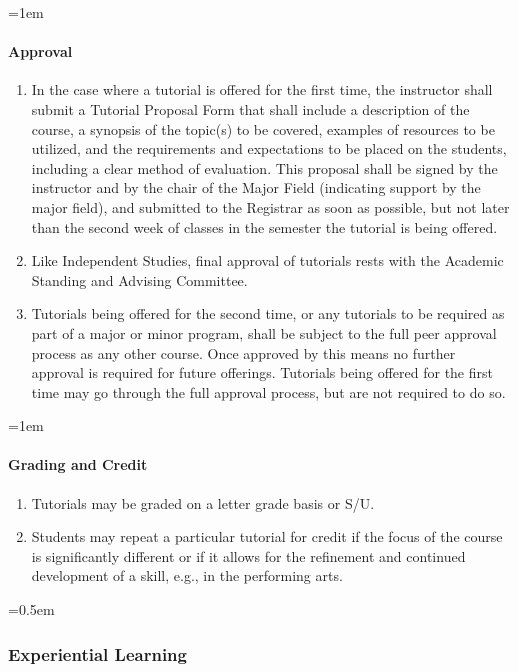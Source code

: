 \documentclass{manual}
\let\oldsubsubsection\subsubsection
\renewcommand\subsubsection{\leftskip=0.5em\oldsubsubsection}
\let\oldparagraph\paragraph
\renewcommand\paragraph{\leftskip=1em\oldparagraph}
\newcommand{\itemLevelA}{\alph*.}
\newcommand{\itemRefA}{\alph*}
\begin{document}
\paragraph{Approval }
\begin{enumerate}[label=\itemLevelA,ref=\itemRefA]
\item In the case where a tutorial is offered for the first time, the instructor shall submit a Tutorial Proposal Form that shall include a description of the course, a synopsis of the topic(s) to be covered, examples of resources to be utilized, and the requirements and expectations to be placed on the students, including a clear method of evaluation.  This proposal shall be signed by the instructor and by the chair of the Major Field (indicating support by the major field), and submitted to the Registrar as soon as possible, but not later than the second week of classes in the semester the tutorial is being offered.  

\item Like Independent Studies, final approval of tutorials rests with the Academic Standing and Advising Committee.

\item Tutorials being offered for the second time, or any tutorials to be required as part of a major or minor program, shall be subject to the full peer approval process as any other course.  Once approved by this means no further approval is required for future offerings.  Tutorials being offered for the first time may go through the full approval process, but are not required to do so.
\end{enumerate}

\paragraph{Grading and Credit}
\begin{enumerate}[label=\itemLevelA,ref=\itemRefA]
\item Tutorials may be graded on a letter grade basis or S/U.

\item Students may repeat a particular tutorial for credit if the focus of the course is significantly different or if it allows for the refinement and continued development of a skill, e.g., in the performing arts.  
\end{enumerate}

\subsubsection{Experiential Learning}
\end{document}
